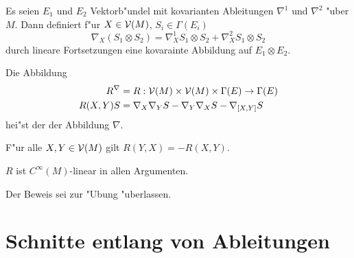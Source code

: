 \begin{Prop}
Es seien $E_1$ und $E_2$ Vektorb"undel mit kovarianten Ableitungen  $\nabla^1$ und $\nabla^2$ "uber $M$. Dann definiert f"ur $X \in \operatorname{\mathcal{V}}(M)$, $S_i \in \Gamma(E_i)$
	\[ \nabla_X (S_1 \otimes S_2) = \nabla_X^1 S_1 \otimes S_2 + \nabla_X^2 S_1 \otimes S_2 \]
durch lineare Fortsetzungen eine kovarainte Abbildung auf $E_1 \otimes E_2$.
\end{Prop}

\begin{Dfn}
Die Abbildung
\begin{align*}
	R^\nabla &= R : \operatorname{\mathcal{V}}(M) \times \operatorname{\mathcal{V}}(M) \times \Gamma(E) \to \Gamma(E)\\
	R(X,Y)S &= \nabla_X \nabla_Y S - \nabla_Y \nabla_X S - \nabla_{[X,Y]} S
\end{align*}
hei"st der  der Abbildung $\nabla$.
\end{Dfn}

\begin{bem}
F"ur alle $X, Y \in \operatorname{\mathcal{V}}(M)$ gilt $R(Y,X) = - R(X,Y)$.
\end{bem}

\begin{Prop}
$R$ ist $C^\infty(M)$-linear in allen Argumenten.
\end{Prop}
Der Beweis sei zur "Ubung "uberlassen.

\section{Schnitte entlang von Ableitungen}

